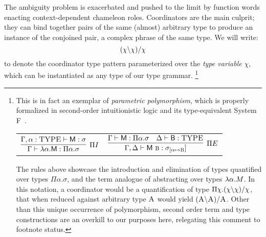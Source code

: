 The ambiguity problem is exacerbated and pushed to the limit by function words enacting context-dependent chameleon roles.
Coordinators are the main culprit; they can bind together pairs of the same (almost) arbitrary type to produce an instance of the conjoined pair, a complex phrase of the same type.
We will write:
\begin{equation}\label{equation:polymorphic_nl_crd}
(\chi\backslash\chi)/\chi
\end{equation}
to denote the coordinator type pattern parameterized over the \textit{type variable} $\chi$, which can be instantiated as any type of our type grammar.%
\footnote{
This is in fact an exemplar of \textit{parametric polymorphism}, which is properly formalized in second-order intuitionistic logic and its type-equivalent System F~\cite{girard1972interpretation, reynolds1974towards}. 
\begin{center}
\begin{tabularx}{0.6\textwidth}{@{}cc@{}}
$\infer[\Pi I]{\Gamma \vdash \lam \alpha.\term{M}: \Pi \alpha.\sigma}{\Gamma, \alpha : \prop{TYPE} \vdash \term{M}: \sigma}$
&
$\infer[\Pi E]{\Gamma, \Delta \vdash \term{M~\prop{b}}: \sigma_{[\alpha\mapsto\smallprop{B}}]}{\Gamma \vdash\term{M}: \Pi \alpha.\sigma &  \Delta \vdash \term{B}: \prop{TYPE}}$
\end{tabularx}
\end{center}
The rules above showcase the introduction and elimination of types quantified over types $\Pi \alpha.\sigma$, and the term analogue of abstracting over types $\mathnormal{\lambda} \alpha.M$.
In this notation, a coordinator would be a quantification of type $\Pi\chi.(\chi\backslash\chi)/\chi$, that when reduced against arbitrary type $\normalfont\textsc{A}$ would yield $(\normalfont\textsc{A}\backslash\normalfont\textsc{A})/\normalfont\textsc{A}$.
Other than this unique occurrence of polymorphism, second order term and type constructions are an overkill to our purposes here, relegating this comment to footnote status.
}

